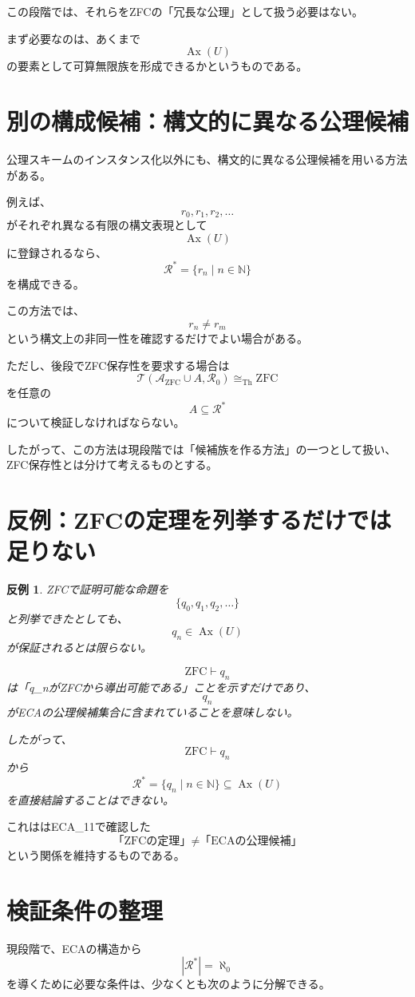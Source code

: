\documentclass[a4paper,11pt]{article}
\newtheorem{counterexample}[definition]{反例}
\newcommand{\ZFC}{\mathrm{ZFC}}
\begin{document}
この段階では、それらをZFCの「冗長な公理」として扱う必要はない。

まず必要なのは、あくまで
\[
\operatorname{Ax}(U)
\]
の要素として可算無限族を形成できるかというものである。

\section{別の構成候補：構文的に異なる公理候補}

公理スキームのインスタンス化以外にも、構文的に異なる公理候補を用いる方法がある。

例えば、
\[
r_0,r_1,r_2,\ldots
\]
がそれぞれ異なる有限の構文表現として
\[
\operatorname{Ax}(U)
\]
に登録されるなら、
\[
\mathcal{R}^*
=
\{r_n\mid n\in\mathbb{N}\}
\]
を構成できる。

この方法では、
\[
r_n\neq r_m
\]
という構文上の非同一性を確認するだけでよい場合がある。

ただし、後段でZFC保存性を要求する場合は
\[
\mathcal{T}
\left(
\mathcal{A}_{\mathrm{ZFC}}\cup A,\mathcal{R}_0
\right)
\cong_{\mathrm{Th}}\ZFC
\]
を任意の
\[
A\subseteq\mathcal{R}^*
\]
について検証しなければならない。

したがって、この方法は現段階では「候補族を作る方法」の一つとして扱い、ZFC保存性とは分けて考えるものとする。

\section{反例：ZFCの定理を列挙するだけでは足りない}

\begin{counterexample}
ZFCで証明可能な命題を
\[
\{q_0,q_1,q_2,\ldots\}
\]
と列挙できたとしても、
\[
q_n\in\operatorname{Ax}(U)
\]
が保証されるとは限らない。

\[
\ZFC\vdash q_n
\]
は「q_nがZFCから導出可能である」ことを示すだけであり、
\[
q_n
\]
がECAの公理候補集合に含まれていることを意味しない。

したがって、
\[
\ZFC\vdash q_n
\]
から
\[
\mathcal{R}^*
=
\{q_n\mid n\in\mathbb{N}\}
\subseteq\operatorname{Ax}(U)
\]
を直接結論することはできない。
\end{counterexample}

これははECA_11で確認した
\[
\text{「ZFCの定理」}
\neq
\text{「ECAの公理候補」}
\]
という関係を維持するものである。

\section{検証条件の整理}
現段階で、ECAの構造から
\[
|\mathcal{R}^*|=\aleph_0
\]
を導くために必要な条件は、少なくとも次のように分解できる。
\end{document}
